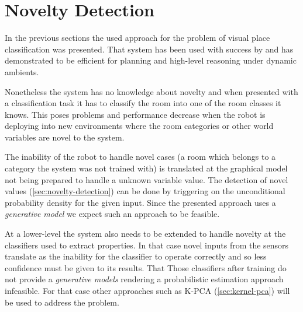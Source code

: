 \section{Novelty Detection}
\label{sec:approach-novelty}
In the previous sections the used approach for the problem of visual place classification was presented.
That system has been used with success by \cite{pronobis2011exploiting} and has demonstrated to be efficient for planning and high-level reasoning under dynamic ambients.

Nonetheless the system has no knowledge about novelty and when presented with a classification task it has to classify the room into one of the room classes it knows.
This poses problems and performance decrease when the robot is deploying into new environments where the room categories or other world variables are novel to the system.

The inability of the robot to handle novel cases (a room which belongs to a category the system was not trained with) is translated at the graphical model not being prepared to handle a unknown variable value.
The detection of novel values (\autoref{sec:novelty-detection}) can be done by triggering on the unconditional probability density for the given input.
Since the presented approach uses a \emph{generative model} we expect such an approach to be feasible.

At a lower-level the system also needs to be extended to handle novelty at the classifiers used to extract properties. In that case novel inputs from the sensors translate as the inability for the classifier to operate correctly and so less confidence must be given to its results. That 
Those classifiers after training do not provide a \emph{generative models} rendering a probabilistic estimation approach infeasible.
For that case other approaches such as \gls{K-PCA} (\autoref{sec:kernel-pca}) will be used to address the problem.

